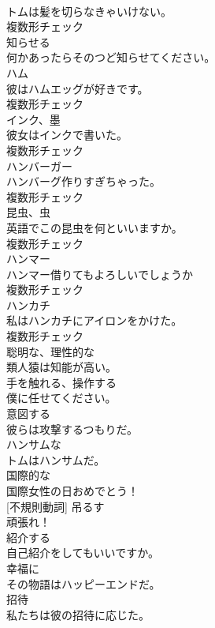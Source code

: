 \documentclass[8pt]{extreport}
\begin{document}
\begin{CJK}{UTF8}{min}
\\	トムは髪を切らなきゃいけない。	
\\	複数形チェック
\\	[動詞]	知らせる	
\\	何かあったらそのつど知らせてください。	
\\	[名詞]	ハム	
\\	彼はハムエッグが好きです。	
\\	複数形チェック
\\	[名詞]	インク、墨	
\\	彼女はインクで書いた。	
\\	複数形チェック
\\	[名詞]	ハンバーガー	
\\	ハンバーグ作りすぎちゃった。	
\\	複数形チェック
\\	[名詞]	昆虫、虫	
\\	英語でこの昆虫を何といいますか。	
\\	複数形チェック
\\	[名詞]	ハンマー	
\\	ハンマー借りてもよろしいでしょうか	
\\	複数形チェック
\\	[名詞]	ハンカチ	
\\	私はハンカチにアイロンをかけた。	
\\	複数形チェック
\\	[形容詞]	聡明な、理性的な	
\\	類人猿は知能が高い。	
\\	[動詞]	手を触れる、操作する	
\\	僕に任せてください。	
\\	[動詞]	意図する	
\\	彼らは攻撃するつもりだ。	
\\	[形容詞]	ハンサムな	
\\	トムはハンサムだ。	
\\	[形容詞]	国際的な	
\\	国際女性の日おめでとう！	
\\	[動詞] [不規則動詞]	吊るす	
\\	頑張れ！	
\\	[動詞]	紹介する	
\\	自己紹介をしてもいいですか。	
\\	[副詞]	幸福に	
\\	その物語はハッピーエンドだ。	
\\	[名詞]	招待	
\\	私たちは彼の招待に応じた。	

\end{CJK}
\end{document}

